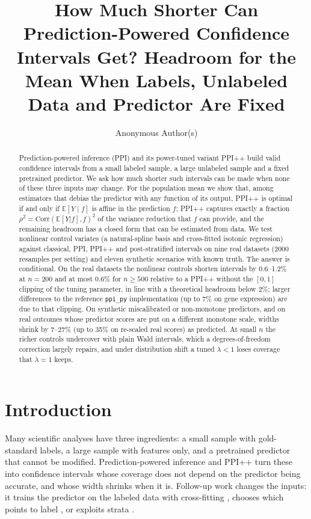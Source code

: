 \documentclass{article}
\title{How Much Shorter Can Prediction-Powered Confidence Intervals Get? Headroom for the Mean When Labels, Unlabeled Data and Predictor Are Fixed}
\author{Anonymous Author(s)}
\newcommand{\E}{\mathbb{E}}
\begin{document}
\maketitle

\begin{abstract}
Prediction-powered inference (PPI) and its power-tuned variant PPI++ build valid confidence intervals from a small labeled sample, a large unlabeled sample and a fixed pretrained predictor. We ask how much shorter such intervals can be made when none of these three inputs may change. For the population mean we show that, among estimators that debias the predictor with any function of its output, PPI++ is optimal if and only if $\E[Y\mid f]$ is affine in the prediction $f$; PPI++ captures exactly a fraction $\rho^2=\mathrm{Corr}(\E[Y|f],f)^2$ of the variance reduction that $f$ can provide, and the remaining headroom has a closed form that can be estimated from data. We test nonlinear control variates (a natural-spline basis and cross-fitted isotonic regression) against classical, PPI, PPI++ and post-stratified intervals on nine real datasets (2000 resamples per setting) and eleven synthetic scenarios with known truth. The answer is conditional. On the real datasets the nonlinear controls shorten intervals by 0.6--1.2\% at $n=200$ and at most 0.6\% for $n\ge500$ relative to a PPI++ without the $[0,1]$ clipping of the tuning parameter, in line with a theoretical headroom below 2\%; larger differences to the reference \texttt{ppi\_py} implementation (up to 7\% on gene expression) are due to that clipping. On synthetic miscalibrated or non-monotone predictors, and on real outcomes whose predictor scores are put on a different monotone scale, widths shrink by 7--27\% (up to 35\% on re-scaled real scores) as predicted. At small $n$ the richer controls undercover with plain Wald intervals, which a degrees-of-freedom correction largely repairs, and under distribution shift a tuned $\lambda<1$ loses coverage that $\lambda=1$ keeps.
\end{abstract}

\section{Introduction}
Many scientific analyses have three ingredients: a small sample with gold-standard labels, a large sample with features only, and a pretrained predictor that cannot be modified. Prediction-powered inference \citep{angelopoulos2023ppi} and PPI++ \citep{angelopoulos2023ppipp} turn these into confidence intervals whose coverage does not depend on the predictor being accurate, and whose width shrinks when it is. Follow-up work changes the inputs: it trains the predictor on the labeled data with cross-fitting \citep{zrnic2023cross}, chooses which points to label \citep{zrnic2024active}, or exploits strata \citep{fisch2024stratified}.
\end{document}
